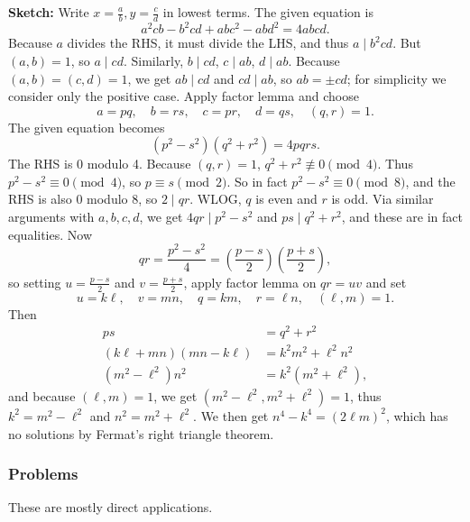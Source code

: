 \documentclass[11pt,paper=letter]{scrartcl}
\begin{document}
\begin{enumerate}
\textbf{Sketch:} Write $x = \frac{a}{b}, y = \frac{c}{d}$ in lowest terms. The given equation is \[
  a^2cb - b^2cd + abc^2 - abd^2 = 4abcd.
\]
Because $a$ divides the RHS, it must divide the LHS, and thus $a \mid b^2cd$. But $(a, b) = 1$, so $a \mid cd$. Similarly, $b \mid cd$, $c \mid ab$, $d \mid ab$. Because $(a, b) = (c, d) = 1$, we get $ab \mid cd$ and $cd \mid ab$, so $ab = \pm cd$; for simplicity we consider only the positive case. Apply factor lemma and choose \[
  a = pq, \quad b = rs, \quad c = pr, \quad d = qs, \quad (q, r) = 1.
\]
The given equation becomes \[
  (p^2 - s^2)(q^2 + r^2) = 4pqrs.
\]
The RHS is $0$ modulo 4. Because $(q, r) = 1$, $q^2 + r^2 \not\equiv 0 \pmod 4$. Thus $p^2 - s^2 \equiv 0 \pmod 4$, so $p \equiv s \pmod 2$. So in fact $p^2 - s^2 \equiv 0 \pmod 8$, and the RHS is also $0$ modulo 8, so $2 \mid qr$. WLOG, $q$ is even and $r$ is odd. Via similar arguments with $a, b, c, d$, we get $4qr \mid p^2 - s^2$ and $ps \mid q^2 + r^2$, and these are in fact equalities. Now \[
  qr = \frac{p^2 - s^2}{4} = \left( \frac{p - s}{2} \right) \left( \frac{p + s}{2} \right),
\]
so setting $u = \frac{p - s}{2}$ and $v = \frac{p + s}{2}$, apply factor lemma on $qr = uv$ and set \[
  u = k\ell, \quad v = mn, \quad q = km, \quad r = \ell n, \quad (\ell, m) = 1.
\]
Then \begin{align*}
  ps &= q^2 + r^2 \\
  (k \ell + mn)(mn - k \ell) &= k^2m^2 + \ell^2n^2 \\
  (m^2 - \ell^2)n^2 &= k^2(m^2 + \ell^2),
\end{align*}
and because $(\ell, m) = 1$, we get $(m^2 - \ell^2, m^2 + \ell^2) = 1$, thus $k^2 = m^2 - \ell^2$ and $n^2 = m^2 + \ell^2$. We then get $n^4 - k^4 = (2 \ell m)^2$, which has no solutions by Fermat's right triangle theorem.

\end{enumerate}

\subsubsection*{Problems}

These are mostly direct applications.
\end{document}
